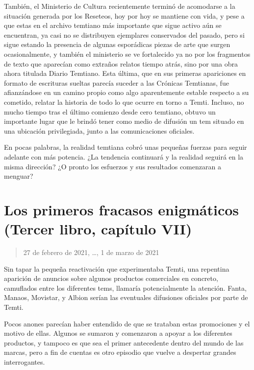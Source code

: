 \documentclass[
]{book}
\begin{document}
También, el Ministerio de Cultura recientemente terminó de acomodarse a la situación generada por los Reseteos, hoy por hoy se mantiene con vida, y pese a que estas en el archivo temtiano más importante que sigue activo aún se encuentran, ya casi no se distribuyen ejemplares conservados del pasado, pero si sigue estando la presencia de algunas esporádicas piezas de arte que surgen ocasionalmente, y también el ministerio se ve fortalecido ya no por los fragmentos de texto que aparecían como extraños relatos tiempo atrás, sino por una obra ahora titulada Diario Temtiano. Esta última, que en sus primeras apariciones en formato de escrituras sueltas parecía suceder a las Crónicas Temtianas, fue afianzándose en un camino propio como algo aparentemente estable respecto a su cometido, relatar la historia de todo lo que ocurre en torno a Temti. Incluso, no mucho tiempo tras el último comienzo desde cero temtiano, obtuvo un importante lugar que le brindó tener como medio de difusión un tem situado en una ubicación privilegiada, junto a las comunicaciones oficiales.

En pocas palabras, la realidad temtiana cobró unas pequeñas fuerzas para seguir adelante con más potencia. ¿La tendencia continuará y la realidad seguirá en la misma dirección? ¿O pronto los esfuerzos y sus resultados comenzaran a menguar?

\hypertarget{los-primeros-fracasos-enigmuxe1ticos-tercer-libro-capuxedtulo-vii}{%
\section{Los primeros fracasos enigmáticos (Tercer libro, capítulo VII)}\label{los-primeros-fracasos-enigmuxe1ticos-tercer-libro-capuxedtulo-vii}}

\begin{quote}
27 de febrero de 2021, \ldots, 1 de marzo de 2021
\end{quote}

Sin tapar la pequeña reactivación que experimentaba Temti, una repentina aparición de anuncios sobre algunos productos comerciales en concreto, camuflados entre los diferentes tems, llamaría potencialmente la atención. Fanta, Manaos, Movistar, y Albion serían las eventuales difusiones oficiales por parte de Temti.

Pocos anones parecían haber entendido de que se trataban estas promociones y el motivo de ellas. Algunos se sumaron y comenzaron a apoyar a los diferentes productos, y tampoco es que sea el primer antecedente dentro del mundo de las marcas, pero a fin de cuentas es otro episodio que vuelve a despertar grandes interrogantes.
\end{document}
